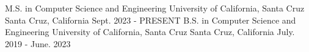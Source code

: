 

\begin{cventries}

  \cventry
    {M.S. in Computer Science and Engineering} %
    {University of California, Santa Cruz} %
    {Santa Cruz, California} %
    {Sept. 2023 - PRESENT} %
    {}
  \vspace{0.2in}
  \cventry
    {B.S. in Computer Science and Engineering} %
    {University of California, Santa Cruz} %
    {Santa Cruz, California} %
    {July. 2019 - June. 2023} %
    {
    }

\end{cventries}
